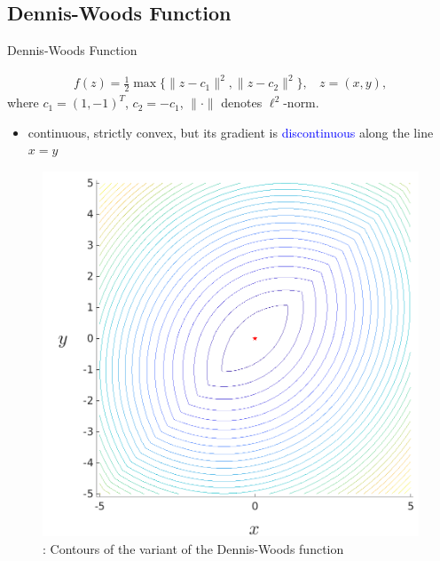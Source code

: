 \documentclass{beamer}
\begin{document}
%


\subsection{Dennis-Woods Function}

\begin{frame}{Dennis-Woods Function}

\footnotesize{
\begin{align*}
	f(z) = \frac{1}{2}\max\{\|z - c_1 \|^2, \|z - c_2
	\|^2\}, ~~~~ z = (x,y),
	\label{eqn:dwfun}
\end{align*}
where $c_1 = (1,-1)^T$, $c_2 = -c_1$, $\|\cdot\|$ denotes
$\ell^2$-norm.
\begin{itemize}
	\item continuous, strictly convex, but its gradient is
		\textcolor{blue}{discontinuous} along the line $x=y$
\end{itemize}
}
\begin{figure}[!htbp]
	\centering
	  \includegraphics[scale=0.13]{./figures/dWoods.png}
	  \vspace{-0.1cm}
	\footnotesize{
	\caption{: Contours of the variant of the Dennis-Woods function}
	}
\label{fig:dwfun}
\end{figure}
\end{frame}
\end{document}
